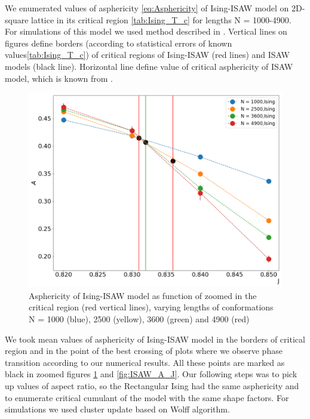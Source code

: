 \documentclass[aps,pre,amssymb,amsmath,twocolumn,floatfix]{revtex4-2}
\begin{document}
We enumerated values of asphericity \eqref{eq:Asphericity} of Ising-ISAW model on 2D-square lattice in its critical region \ref{tab:Ising_T_c} for lengths N = 1000-4900. For simulations of this model we used method described in \cite{faizullina2021critical}. Vertical lines on figures define borders (according to statistical errors of known values\ref{tab:Ising_T_c}) of critical regions of Ising-ISAW (red lines) and ISAW models (black line). Horizontal line define value of critical asphericity of ISAW model, which is known from \cite{Caracciolo_2011}.

\begin{figure}[h!]
    \centering
    \includegraphics[width=\columnwidth]{Images/Ising_A_J_Close.png}
    \caption{Asphericity of Ising-ISAW model as function of zoomed in the critical region (red vertical lines), varying lengths of conformations N = 1000 (blue), 2500 (yellow), 3600 (green) and 4900 (red)}
    \label{fig:Ising_A_J}
\end{figure}

We took mean values of asphericity of Ising-ISAW model in the borders of critical region and in the point of the best crossing of plots where we observe phase transition according to our numerical results. All these points are marked as black in zoomed figures \ref{fig:Ising_A_J} and \ref{fig:ISAW_A_J}. Our following steps was to pick up values of aspect ratio, so the Rectangular Ising had the same asphericity and to enumerate critical cumulant of the model with the same shape factors. For simulations we used cluster update based on Wolff algorithm\cite{newmanb99}.
\end{document}
